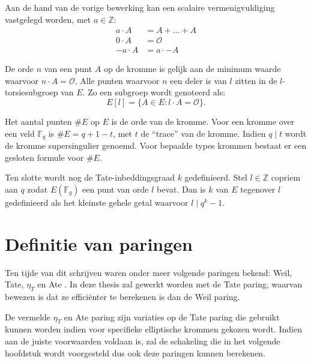 Aan de hand van de vorige bewerking kan een scalaire vermenigvuldiging vastgelegd worden, met $a \in \mathbb{Z}$:
\[\begin{aligned}
a \cdot A	&= A + \ldots + A\\
0 \cdot A	&= \mathcal{O}\\
-a \cdot A	&= a \cdot -A
\end{aligned}\]

De orde $n$ van een punt $A$ op de kromme is gelijk aan de minimum waarde waarvoor $n \cdot A = \mathcal{O}$. Alle punten waarvoor $n$ een deler is van $l$ zitten in de $l$-torsiesubgroep van $E$. Zo een subgroep wordt genoteerd als:
\[E[l] = \{ A \in E : l \cdot A = \mathcal{O} \}.\]

Het aantal punten $\#E$ op $E$ is de orde van de kromme. Voor een kromme over een veld $\mathbb{F}_q$ is $\#E = q + 1 - t$, met $t$ de ``trace'' van de kromme. Indien $q \mid t$ wordt de kromme supersingulier genoemd. Voor bepaalde types krommen bestaat er een gesloten formule voor $\#E$.

Ten slotte wordt nog de Tate-inbeddingsgraad $k$ gedefinieerd. Stel $l \in \mathbb{Z}$ copriem aan $q$ zodat $E(\mathbb{F}_q)$ een punt van orde $l$ bevat. Dan is $k$ van $E$ tegenover $l$ gedefinieerd als het kleinste gehele getal waarvoor $l \mid q^k - 1$.

\section{Definitie van paringen}

Ten tijde van dit schrijven waren onder meer volgende paringen bekend: Weil, Tate, $\eta_T$ \cite{eta} en Ate \cite{ate}. In deze thesis zal gewerkt worden met de Tate paring, waarvan bewezen is dat ze effici\"enter te berekenen is dan de Weil paring.

De vermelde $\eta_T$ en Ate paring zijn variaties op de Tate paring die gebruikt kunnen worden indien voor specifieke elliptische krommen gekozen wordt. Indien aan de juiste voorwaarden voldaan is, zal de schakeling die in het volgende hoofdstuk wordt voorgesteld dus ook deze paringen kunnen berekenen.

